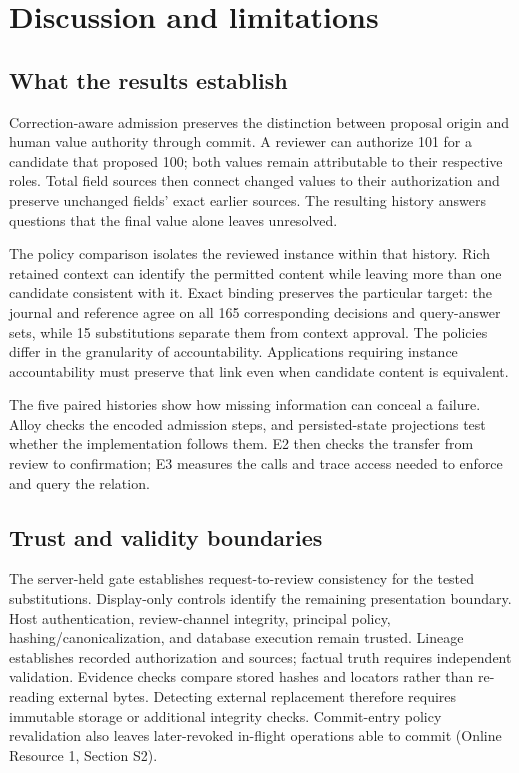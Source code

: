\section{Discussion and limitations}
\label{sec:discussion}

\subsection{What the results establish}

Correction-aware admission preserves the distinction between proposal origin and human value authority through commit. A reviewer can authorize 101 for a candidate that proposed 100; both values remain attributable to their respective roles. Total field sources then connect changed values to their authorization and preserve unchanged fields' exact earlier sources. The resulting history answers questions that the final value alone leaves unresolved.

The policy comparison isolates the reviewed instance within that history. Rich retained context can identify the permitted content while leaving more than one candidate consistent with it. Exact binding preserves the particular target: the journal and reference agree on all 165 corresponding decisions and query-answer sets, while 15 substitutions separate them from context approval. The policies differ in the granularity of accountability. Applications requiring instance accountability must preserve that link even when candidate content is equivalent.

The five paired histories show how missing information can conceal a failure. Alloy checks the encoded admission steps, and persisted-state projections test whether the implementation follows them. E2 then checks the transfer from review to confirmation; E3 measures the calls and trace access needed to enforce and query the relation.

\subsection{Trust and validity boundaries}

The server-held gate establishes request-to-review consistency for the tested substitutions. Display-only controls identify the remaining presentation boundary. Host authentication, review-channel integrity, principal policy, hashing/canonicalization, and database execution remain trusted. Lineage establishes recorded authorization and sources; factual truth requires independent validation. Evidence checks compare stored hashes and locators rather than re-reading external bytes. Detecting external replacement therefore requires immutable storage or additional integrity checks. Commit-entry policy revalidation also leaves later-revoked in-flight operations able to commit (Online Resource 1, Section S2).

